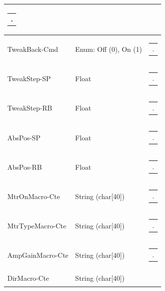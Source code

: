\documentclass[openany]{article}
\begin{document}
\begin{longtable}{| m{4.5cm} m{2.5cm}  m{8.5cm} |}
\begin{tabular}{@{}m{6cm}@{}}
                .
            \end{tabular} \hypertarget{pv:tweak-back-cmd}{}\\ \hline
        TweakBack-Cmd & Enum: Off (0), On (1) & \begin{tabular}{@{}m{6cm}@{}}
                .
            \end{tabular} \hypertarget{pv:tweak-step}{}\\ \hline
        TweakStep-SP & Float & \begin{tabular}{@{}m{6cm}@{}}
                .
            \end{tabular} \hypertarget{}{}\\ \hline
        TweakStep-RB & Float & \begin{tabular}{@{}m{6cm}@{}}
                .
            \end{tabular} \hypertarget{pv:abs-pos}{}\\ \hline
        AbsPos-SP & Float & \begin{tabular}{@{}m{6cm}@{}}
                .
            \end{tabular} \hypertarget{}{}\\ \hline
        AbsPos-RB & Float & \begin{tabular}{@{}m{6cm}@{}}
                .
            \end{tabular} \hypertarget{pv:mtr-on-macro-cte}{}\\ \hline
        MtrOnMacro-Cte & String (char[40]) & \begin{tabular}{@{}m{6cm}@{}}
                .
            \end{tabular} \hypertarget{pv:mtr-type-macro-cte}{}\\ \hline
        MtrTypeMacro-Cte & String (char[40]) & \begin{tabular}{@{}m{6cm}@{}}
                .
            \end{tabular} \hypertarget{pv:amp-gain-macro-cte}{}\\ \hline
        AmpGainMacro-Cte & String (char[40]) & \begin{tabular}{@{}m{6cm}@{}}
                .
            \end{tabular} \hypertarget{pv:dir-macro-cte}{}\\ \hline
        DirMacro-Cte & String (char[40]) & \begin{tabular}{@{}m{6cm}@{}}

\end{tabular}
\end{longtable}
\end{document}
